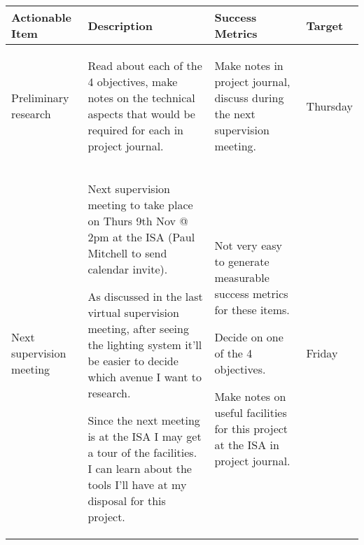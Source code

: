 \pagebreak
\begin{table}[!h]
    \centering
    \begin{tabularx}{\textwidth}{|X|X|X|l|}
        \hline
        Actionable Item & Description & Success Metrics & Target \\
        \hline
        \hline
        Preliminary research &
        \begin{myitemize}
            \item Read about each of the 4 objectives, make notes on the technical aspects that would be required for each in project journal.
        \end{myitemize} &
        \begin{myitemize}
            \item Make notes in project journal, discuss during the next supervision meeting.
        \end{myitemize} &
        Thursday \\
        \hline
        Next supervision meeting &
        \begin{myitemize}
            \item Next supervision meeting to take place on Thurs 9th Nov @ 2pm at the ISA (Paul Mitchell to send calendar invite).
            \item As discussed in the last virtual supervision meeting, after seeing the lighting system it'll be easier to decide which avenue I want to research.
            \item Since the next meeting is at the ISA I may get a tour of the facilities. I can learn about the tools I'll have at my disposal for this project.
        \end{myitemize} &
        \begin{myitemize}
            \item Not very easy to generate measurable success metrics for these items.
            \item Decide on one of the 4 objectives.
            \item Make notes on useful facilities for this project at the ISA in project journal.
        \end{myitemize} &
        Friday \\
        \hline
    \end{tabularx}
\end{table}
